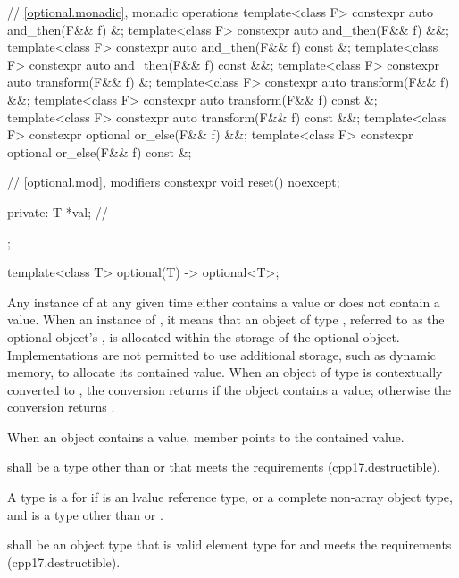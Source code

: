 \begin{codeblock}
{{    // \ref{optional.monadic}, monadic operations
    template<class F> constexpr auto and_then(F&& f) &;
    template<class F> constexpr auto and_then(F&& f) &&;
    template<class F> constexpr auto and_then(F&& f) const &;
    template<class F> constexpr auto and_then(F&& f) const &&;
    template<class F> constexpr auto transform(F&& f) &;
    template<class F> constexpr auto transform(F&& f) &&;
    template<class F> constexpr auto transform(F&& f) const &;
    template<class F> constexpr auto transform(F&& f) const &&;
    template<class F> constexpr optional or_else(F&& f) &&;
    template<class F> constexpr optional or_else(F&& f) const &;

    // \ref{optional.mod}, modifiers
    constexpr void reset() noexcept;

  private:
    T *val;         // \expos
  };

  template<class T>
    optional(T) -> optional<T>;
}
\end{codeblock}

\pnum
Any instance of  at any given time either contains a value or does not contain a value.
When an instance of  ,
it means that an object of type , referred to as the optional object's ,
is allocated within the storage of the optional object.
Implementations are not permitted to use additional storage, such as dynamic memory, to allocate its contained value.
When an object of type  is contextually converted to ,
the conversion returns  if the object contains a value;
otherwise the conversion returns .

\pnum
When an  object contains a value,
member  points to the contained value.

\begin{removedblock}
 shall be a  type
other than \cv{}  or \cv{} 
that meets the  requirements (cpp17.destructible).
\end{removedblock}

\begin{addedblock}
\pnum
A type  is a  for  if  is an lvalue reference type,
or a complete non-array object type, and  is a type other than  or .

\pnum
{} shall be an object type that is valid element type for  and meets the  requirements (cpp17.destructible).
\end{addedblock}

